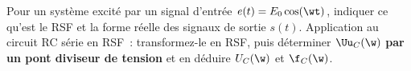 \documentclass[a4paper, 10pt, final, garamond]{book}
\begin{document}
\begin{enumerate}[label=\sqenumi]
\begin{isd}[]
\begin{center}
		\end{center}
		\wsw{
			\[
				\Uu = \Zu\ind{para}\Iu\ind{para} = \Zu_1\Iu_1
				\Lra
				\boxed{
					\Iu_k = \frac{\Zu\ind{para}}{\Zu_k}\Iu\ind{para}
				}
			\]
		}
	\end{isd}
	\begin{minipage}[t]{.65\linewidth}
		Pour un système excité par un signal d'entrée $e(t) = E_0\cos(\wt)$,
		indiquer ce qu'est le RSF et la forme réelle des signaux de sortie $s(t)$.
		Application au circuit RC série en RSF~: transformez-le en RSF, puis
		déterminer $\Uu_C(\w)$ \textbf{par un pont diviseur de tension} et en
		déduire $U_C(\w)$ et $\f_C(\w)$.
	\end{minipage}
	\hfill
	\begin{minipage}[t]{.30\linewidth}
		\vspace{-12pt}
		\begin{center}
\end{center}
\end{minipage}
\end{enumerate}
\end{document}

